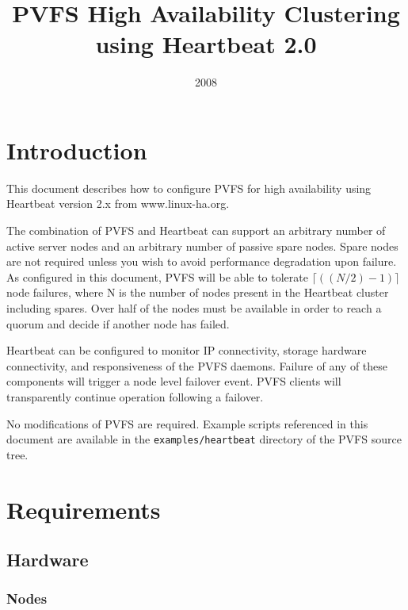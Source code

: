 \documentclass[11pt]{article}
\title{PVFS High Availability Clustering using Heartbeat 2.0}
\date{2008}
\begin{document}
\maketitle

\begin{small}
\tableofcontents
\end{small}

\newpage


\section{Introduction}

This document describes how to configure PVFS for high availability
using Heartbeat version 2.x from www.linux-ha.org.  

The combination of PVFS and Heartbeat can support an arbitrary number
of active server nodes and an arbitrary number of passive spare nodes.
Spare nodes are not required unless you wish to avoid performance
degradation upon failure.  As configured in this document, PVFS will
be able to tolerate $\lceil ((N/2)-1) \rceil$ node failures, where N is
the number of nodes present in the Heartbeat cluster including spares.
Over half of the nodes must be available in order to reach a quorum and
decide if another node has failed.

Heartbeat can be configured to monitor IP connectivity, storage hardware
connectivity, and responsiveness of the PVFS daemons.  Failure of any of
these components will trigger a node level failover event.  PVFS clients
will transparently continue operation following a failover.

No modifications of PVFS are required.  Example scripts referenced in
this document are available in the \texttt{examples/heartbeat} directory of
the PVFS source tree.

\section{Requirements}

\subsection{Hardware}

\subsubsection{Nodes}
\end{document}
